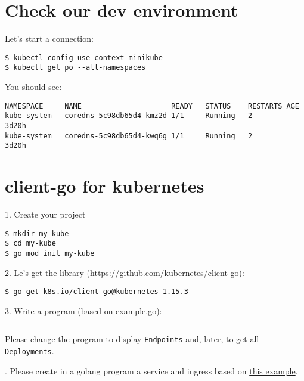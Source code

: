 \documentclass[11pt, letterpaper]{article}
\begin{document}
\section{Check our dev environment}

Let's start a connection:

\begin{verbatim}
$ kubectl config use-context minikube
$ kubectl get po --all-namespaces
\end{verbatim}

You should see:

\begin{verbatim}
NAMESPACE     NAME                     READY   STATUS    RESTARTS AGE
kube-system   coredns-5c98db65d4-kmz2d 1/1     Running   2        3d20h
kube-system   coredns-5c98db65d4-kwq6g 1/1     Running   2        3d20h
\end{verbatim}

\section{client-go for kubernetes}

1. Create your project

\begin{verbatim}
$ mkdir my-kube
$ cd my-kube
$ go mod init my-kube
\end{verbatim}

2. Le's get the library (\href{https://github.com/kubernetes/client-go}{https://github.com/kubernetes/client-go}):

\begin{verbatim}
$ go get k8s.io/client-go@kubernetes-1.15.3
\end{verbatim}

3. Write a program (based on \href{https://github.com/kubernetes/client-go/blob/master/examples/out-of-cluster-client-configuration/main.go}{example.go}):

\inputminted{go}{src/example_1.go}

Please change the program to display \texttt{Endpoints} and, later, to get all \texttt{Deployments}.

. Please create in a golang program a service and ingress based on \href{https://github.com/kubernetes/client-go/blob/master/examples/create-update-delete-deployment/main.go}{this example}.
\end{document}
